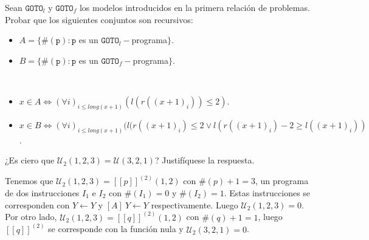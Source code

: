 \documentclass[twoside]{article}
\begin{document}
\begin{ejercicio}{3}
Sean $\texttt{GOTO}_l$ y $\texttt{GOTO}_f$ los modelos introducidos en la primera relación de problemas.
Probar que los siguientes conjuntos son recursivos:
\begin{itemize}
\item $A = \{\#(\texttt{p}) : \texttt{p}$ es un $\texttt{GOTO}_l-$programa$\}$.
\item $B = \{\#(\texttt{p}) : \texttt{p}$ es un $\texttt{GOTO}_f-$programa$\}$.
\end{itemize}
\end{ejercicio}
\begin{solucion}\
\begin{itemize}
\item $x\in A\Leftrightarrow (\forall i)_{i\leq long(x+1)} (l(r((x+1)_i))\leq 2)$.
\item $x\in B\Leftrightarrow (\forall i)_{i\leq long(x+1)} (l(r((x+1)_i)\leq 2\lor l(r((x+1)_i)-2\geq l((x+1)_i))$.
\end{itemize}
\end{solucion}

\newpage

\begin{ejercicio}{4}
¿Es ciero que $\mathcal{U}_2(1,2,3) = \mathcal{U}(3,2,1)$? Justifíquese la respuesta.
\end{ejercicio}
\begin{solucion}
Tenemos que $\mathcal{U}_2(1,2,3) = [[p]]^{(2)}(1,2)$ con $\#(p)+1= 3$,  un programa de dos instrucciones $I_1$ e $I_2$ con $\#(I_1) = 0$ y $\#(I_2) = 1$. Estas instrucciones se corresponden con $Y \leftarrow Y$ y $[A]\ Y \leftarrow Y$ respectivamente. Luego $\mathcal{U}_2(1,2,3) = 0$. Por otro lado, $\mathcal{U}_2(1,2,3) = [[q]]^{(2)}(1,2)$ con $\#(q)+1= 1$, luego $[[q]]^{(2)}$ se corresponde con la función nula y $\mathcal{U}_2(3,2,1) = 0$.
\end{solucion}

\newpage
\end{document}
